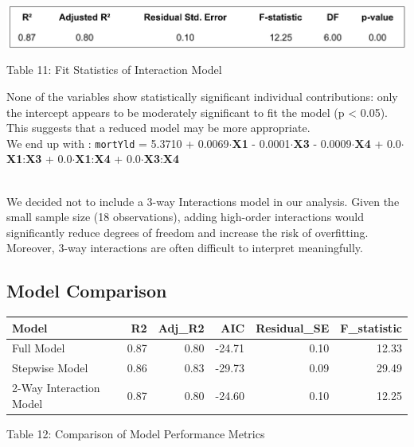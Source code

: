 \documentclass[
  12pt,
]{article}
\begin{document}
\includegraphics[width=1\linewidth]{figures/interaction_model_fitstats.png}

\par

\fontsize{12}{14}\selectfont Table 11: Fit Statistics of Interaction
Model

\par
\addtocounter{table}{2}

None of the variables show statistically significant individual
contributions: only the intercept appears to be moderately significant
to fit the model (p \textless{} 0.05). This suggests that a reduced
model may be more appropriate.\\
We end up with : \texttt{mortYld} = 5.3710 + 0.0069\(\cdot\)\textbf{X1}
- 0.0001\(\cdot\)\textbf{X3} - 0.0009\(\cdot\)\textbf{X4} +
0.0\(\cdot\)\textbf{X1}:\textbf{X3} +
0.0\(\cdot\)\textbf{X1}:\textbf{X4} +
0.0\(\cdot\)\textbf{X3}:\textbf{X4}\\
\strut \\
We decided not to include a 3-way Interactions model in our analysis.
Given the small sample size (18 observations), adding high-order
interactions would significantly reduce degrees of freedom and increase
the risk of overfitting. Moreover, 3-way interactions are often
difficult to interpret meaningfully.

\subsection{Model Comparison}\label{model-comparison}

\begingroup\fontsize{8}{10}\selectfont

\begin{longtable}[t]{lrrrrr}
\toprule
Model & R2 & Adj\_R2 & AIC & Residual\_SE & F\_statistic\\
\midrule
Full Model & 0.87 & 0.80 & -24.71 & 0.10 & 12.33\\
Stepwise Model & 0.86 & 0.83 & -29.73 & 0.09 & 29.49\\
2-Way Interaction Model & 0.87 & 0.80 & -24.60 & 0.10 & 12.25\\
\bottomrule
\end{longtable}
\endgroup{}
\begin{center}
{\fontsize{12}{14}\selectfont Table 12: Comparison of Model Performance Metrics\par}
\end{center}
\end{document}
